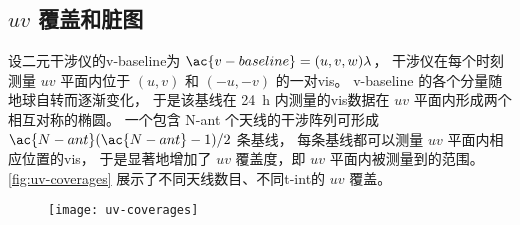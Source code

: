 \subsection{\texorpdfstring{$uv$}{uv} 覆盖和脏图}
\label{sec:uv-coverage}

设二元干涉仪的\acl{v-baseline}为 $\ac{v-baseline} = (u,v,w)\lambda$，
干涉仪在每个时刻测量 $uv$ 平面内位于 $(u,v)$ 和 $(-u,-v)$ 的一对\ac{vis}。
\ac{v-baseline} 的各个分量随地球自转而逐渐变化，
于是该基线在 \SI{24}{\hour} 内测量的\ac{vis}数据在 $uv$ 平面内形成两个相互对称的椭圆。
一个包含 \ac{N-ant} 个天线的干涉阵列可形成
$\ac{N-ant}(\ac{N-ant}-1)/2$ 条基线，
每条基线都可以测量 $uv$ 平面内相应位置的\ac{vis}，
于是显著地增加了 $uv$ 覆盖度，即 $uv$ 平面内被测量到的范围。
\autoref{fig:uv-coverages} 展示了不同天线数目、不同\ac{t-int}的 $uv$ 覆盖。

\begin{figure}[htp]
  \centering
  \texttt{[image: uv-coverages]}
  \label{fig:uv-coverages}
\end{figure}


